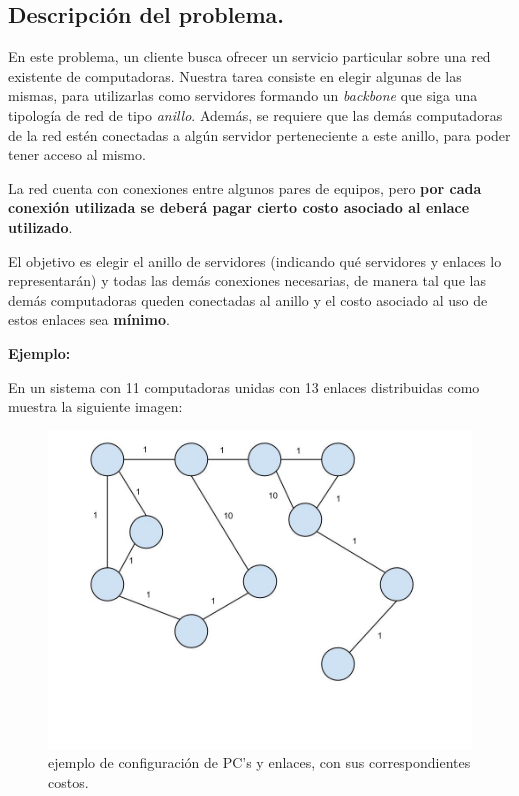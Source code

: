 \subsection{Descripción del problema.}

\vspace*{0.3cm}

En este problema, un cliente busca ofrecer un servicio particular sobre una
red existente de computadoras. Nuestra tarea consiste en elegir algunas de las
mismas, para utilizarlas como servidores formando un \textit{backbone} que
siga una tipología de red de tipo \textit{anillo}. Además, se requiere que
las demás computadoras de la red estén conectadas a algún servidor
perteneciente a este anillo, para poder tener acceso al mismo.

La red cuenta con conexiones entre algunos pares de equipos, pero
\textbf{por cada conexión utilizada se deberá pagar cierto costo
asociado al enlace utilizado}.

\medskip

El objetivo es elegir el anillo de servidores (indicando qué servidores y
enlaces lo representarán) y todas las demás conexiones necesarias, de
manera tal que las demás computadoras queden conectadas al anillo y el costo
asociado al uso de estos enlaces sea \textbf{mínimo}.

\vspace*{0.5cm}

\textbf{Ejemplo:}

En un sistema con 11 computadoras unidas con 13 enlaces distribuidas como
muestra la siguiente imagen:

\begin{figure}[htb]
  \begin{center}
      \includegraphics[scale=0.25]{imagenes/anillo-sin-hacer.jpg}
  \end{center}
  \caption{ejemplo de configuración de PC's y enlaces, con sus correspondientes costos.}
\end{figure}

